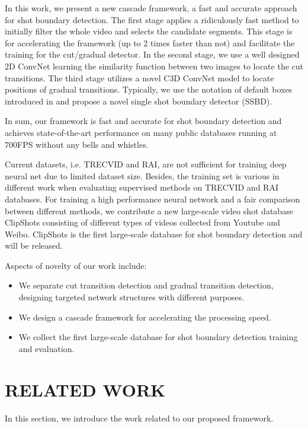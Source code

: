 \documentclass[runningheads]{llncs}
\begin{document}
In this work, we present a new cascade framework, a fast and accurate approach for shot boundary detection. The first stage applies a ridiculously fast method to initially filter the whole video and selects the candidate segments. This stage is for accelerating the framework (up to 2 times faster than not) and facilitate the training for the cut/gradual detector. In the second stage, we use a well designed 2D ConvNet learning the similarity function between two images to locate the cut transitions. The third stage utilizes a novel C3D ConvNet model to locate positions of gradual transitions. Typically, we use the notation of default boxes introduced in \cite{liu2016ssd} and propose a novel single shot boundary detector (SSBD).

In sum, our framework is fast and accurate for shot boundary detection and achieves state-of-the-art performance on many public databases running at 700FPS without any bells and whistles.

Current datasets, i.e. TRECVID and RAI, are
not sufficient for training deep neural net due to limited dataset size. Besides, the training set is various in different work when evaluating supervised methods on TRECVID and RAI databases. For training a high performance neural network and a fair comparison between different methods, we contribute a new large-scale video shot database ClipShots consisting of different types of videos collected from Youtube and Weibo. ClipShots is the first large-scale database for shot boundary detection and will be released.

Aspects of novelty of our work include: 
\begin{itemize}
\item We separate cut transition detection and gradual transition detection, designing targeted network structures with different purposes. 
\item We design a cascade framework for accelerating the processing speed. 
\item We collect the first large-scale database for shot boundary detection training and evaluation.
\end{itemize}

\section{RELATED WORK}
In this section, we introduce the work related to our proposed framework.
\end{document}
